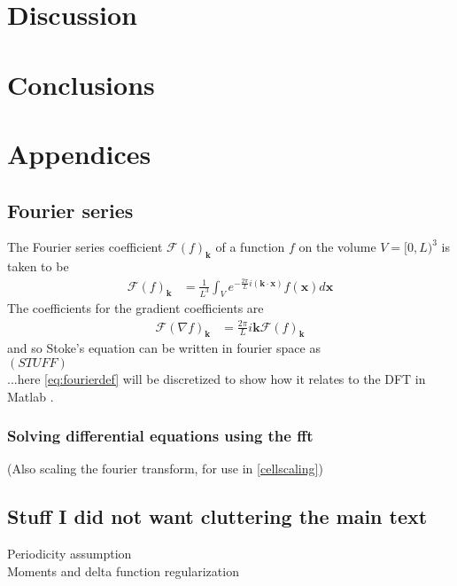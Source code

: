 \documentclass[a4paper,twoside=false,abstract=false,numbers=noenddot,
titlepage=false,headings=small,parskip=half,version=last]{scrartcl}
\begin{document}
\section{Discussion}

\section{Conclusions}


{}


\section{Appendices}
\subsection{Fourier series}
The Fourier series coefficient $\mathcal{F}(f)_{\mathbf{k}}$ of a function $f$ on the volume $V=[0,L)^3$ is taken to be
\begin{align}
\mathcal{F}(f)_{\mathbf{k}} &= \frac{1}{L^3} \int_V e^{-\frac{2\pi}{L}i(\mathbf{k}\cdot \mathbf{x})}f(\mathbf{x})d\mathbf{x}
    \label{eq:fourierdef}
\end{align}
The coefficients for the gradient coefficients are
\begin{align}
\mathcal{F}(\nabla f)_{\mathbf{k}} &= \frac{2\pi}{L}i\mathbf{k} \mathcal{F}(f)_{\mathbf{k}}
\end{align}
and so Stoke's equation can be written in fourier space as \\
$\left(STUFF\right)$\\
...here \eqref{eq:fourierdef} will be discretized to show how it relates to the DFT in Matlab \cite{matlab}.

\subsubsection{Solving differential equations using the fft}
(Also scaling the fourier transform, for use in \ref{cellscaling})
\subsection{Stuff I did not want cluttering the main text}
Periodicity assumption\\
Moments and delta function regularization
\end{document}
